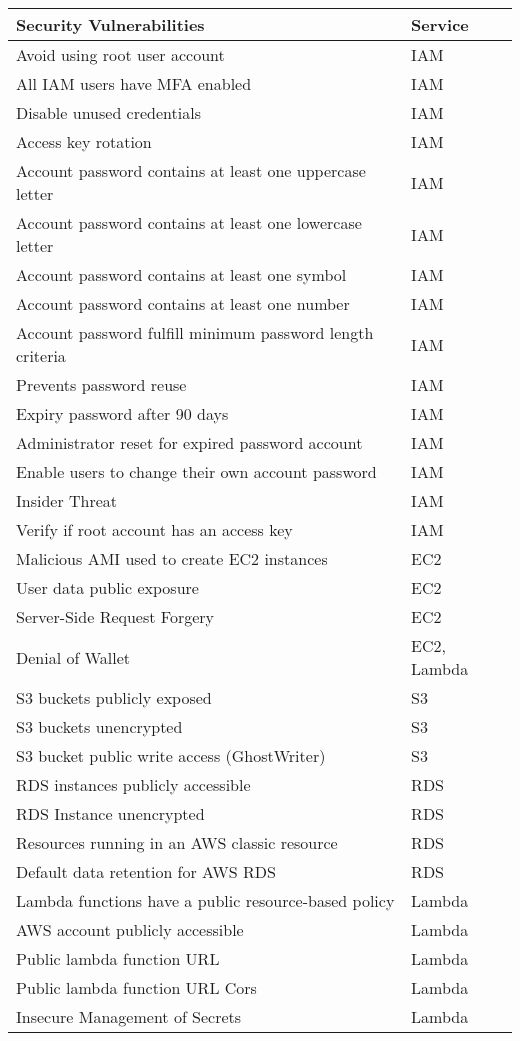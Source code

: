 \begin{longtable}{|p{12cm}|p{2.4cm}|}
    \hline
    \textbf{Security Vulnerabilities} & \textbf{Service} \\
    \hline
    Avoid using root user account & IAM \\
    \hline
    All IAM users have MFA enabled & IAM  \\
    \hline
    Disable unused credentials & IAM  \\
    \hline
    Access key rotation & IAM  \\
    \hline
    Account password contains at least one uppercase letter & IAM
    \\
    \hline
    Account password contains at least one lowercase letter &
    IAM  \\
    \hline
    Account password contains at least one symbol & IAM \\
    \hline
    Account password contains at least one number & IAM \\
    \hline
    Account password fulfill minimum password length criteria & IAM \\
    \hline
    Prevents password reuse & IAM \\
    \hline
    Expiry password after 90 days & IAM \\
    \hline
    Administrator reset for expired password account & IAM \\
    \hline
    Enable users to change their own account password & IAM \\
    \hline
    Insider Threat & IAM \\
    \hline
    Verify if root account has an access key & IAM \\
    \hline
    Malicious AMI used to create EC2 instances  & EC2 \\
    \hline
    User data public exposure & EC2 \\
    \hline
    Server-Side Request Forgery & EC2 \\
    \hline
    Denial of Wallet & EC2, Lambda \\
    \hline
    S3 buckets publicly exposed & S3 \\
    \hline
    S3 buckets unencrypted & S3 \\
    \hline
    S3 bucket public write access (GhostWriter) & S3  \\
    \hline
    RDS instances publicly accessible & RDS \\
    \hline
    RDS Instance unencrypted & RDS \\
    \hline
    Resources running in an AWS classic resource & RDS \\
    \hline
    Default data retention for AWS RDS & RDS \\
    \hline
    Lambda functions have a public resource-based policy & Lambda \\
    \hline
    AWS account publicly accessible & Lambda \\
    \hline
    Public lambda function URL & Lambda \\
    \hline
    Public lambda function URL Cors & Lambda \\
    \hline
    Insecure Management of Secrets & Lambda \\
    \hline


\end{longtable}
